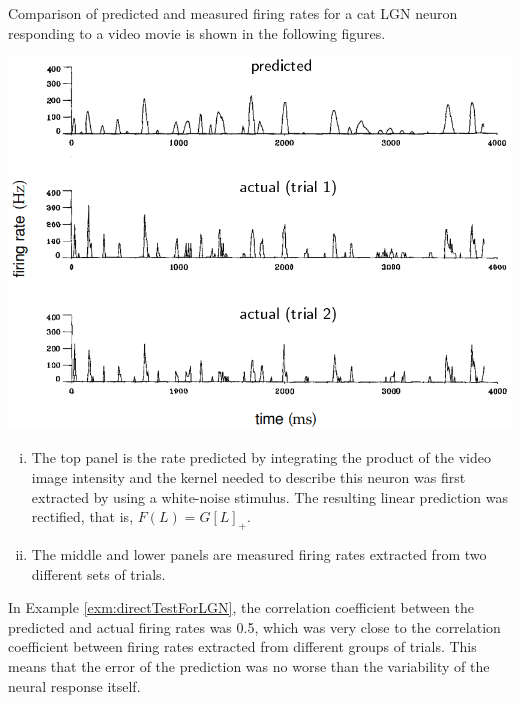 \begin{exm}
  \label{exm:directTestForLGN}
   Comparison of predicted and measured firing rates for a cat LGN neuron responding to a video movie is shown in the following figures.
  \begin{center}
    \includegraphics[scale=0.3]{./png/directTestForLGN}
  \end{center}
  \begin{enumerate}[(i)]
  \item The top panel is the rate predicted by integrating the product of the video image intensity and the kernel needed to describe this neuron was first extracted by using a white-noise stimulus. The resulting linear prediction was rectified, that is, $F(L) = G[L]_+$.
  \item The middle and lower panels are measured firing rates extracted from two different sets of trials.
  \end{enumerate}
\end{exm}

\begin{rem}
  In Example \ref{exm:directTestForLGN}, the correlation coefficient between the predicted and actual firing rates was 0.5, which was very close to the correlation coefficient between firing rates extracted from different groups of trials. This means that the error of the prediction was no worse than the variability of the neural response itself.
\end{rem}

